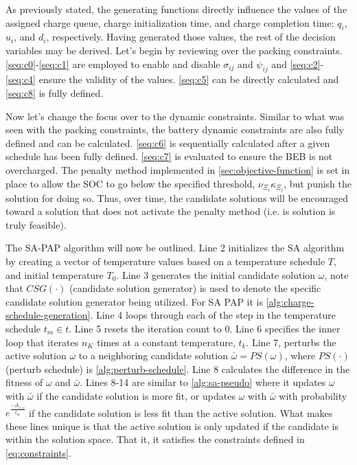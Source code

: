 \documentclass[11pt,a4paper,final]{article}
\newcommand{\Tau}{T}                        %
\begin{document}
As previously stated, the generating functions directly influence the values of the assigned charge queue, charge
initialization time, and charge completion time: \(q_i\), \(u_i\), and \(d_i\), respectively. Having generated those values,
the rest of the decision variables may be derived. Let's begin by reviewing over the packing constraints.
\ref{seq:c0}-\ref{seq:c1} are employed to enable and disable \(\sigma_{ij}\) and \(\psi_{ij}\) and \ref{seq:c2}-\ref{seq:c4} ensure
the validity of the values. \ref{seq:c5} can be directly calculated and \ref{seq:c8} is fully defined.

Now let's change the focus over to the dynamic constraints. Similar to what was seen with the packing constraints, the
battery dynamic constraints are also fully defined and can be calculated. \ref{seq:c6} is sequentially calculated after
a given schedule has been fully defined. \ref{seq:c7} is evaluated to ensure the BEB is not overcharged. The penalty
method implemented in \ref{sec:objective-function} is set in place to allow the SOC to go below the specified threshold,
\(\nu_{\Xi_i} \kappa_{\Xi_i}\), but punish the solution for doing so. Thus, over time, the candidate solutions will be encouraged
toward a solution that does not activate the penalty method (i.e. is solution is truly feasible).

The SA-PAP algorithm will now be outlined. Line 2 initializes the SA algorithm by creating a vector of temperature
values based on a temperature schedule \(\Tau\), and initial temperature \(\Tau_0\). Line 3 generates the initial candidate
solution \(\omega\), note that \(CSG(\cdot)\) (candidate solution generator) is used to denote the specific candidate solution
generator being utilized. For SA PAP it is \ref{alg:charge-schedule-generation}. Line 4 loops through each of the step
in the temperature schedule \(t_m \in t\). Line 5 resets the iteration count to 0. Line 6 specifies the inner loop that
iterates \(n_K\) times at a constant temperature, \(t_k\). Line 7, perturbs the active solution \(\omega\) to a neighboring
candidate solution \(\bar{\omega} = PS(\omega)\), where \(PS(\cdot)\) (perturb schedule) is \ref{alg:perturb-schedule}. Line 8 calculates
the difference in the fitness of \(\omega\) and \(\bar{\omega}\). Lines 8-14 are similar to \ref{alg:sa-pseudo} where it updates \(\omega\)
with \(\bar{\omega}\) if the candidate solution is more fit, or updates \(\omega\) with \(\bar{\omega}\) with probability
\(e^{\frac{-\Delta_{\bar{\omega},\omega}}{t_m}}\) if the candidate solution is less fit than the active solution. What makes these lines
unique is that the active solution is only updated if the candidate is within the solution space. That it, it satisfies
the constraints defined in \ref{eq:constraints}.
\end{document}
